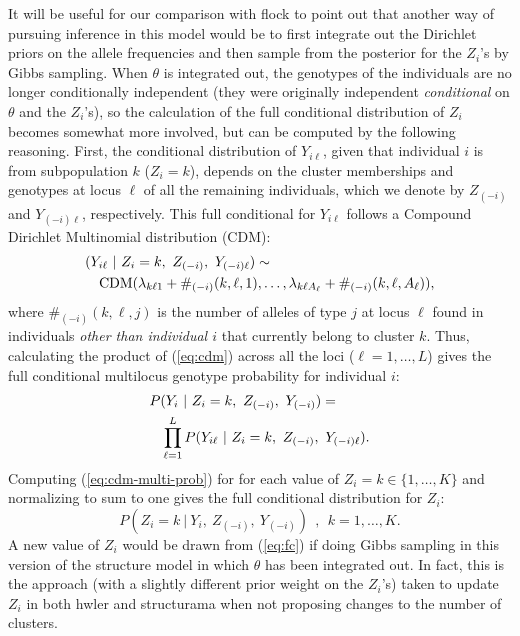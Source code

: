 It will be useful for our comparison with {\sc flock} to point out that another way 
of pursuing inference in this model would be to first integrate out the 
Dirichlet priors on the allele frequencies and then sample from the posterior
for the $Z_i$'s by Gibbs sampling.  When $\theta$ is integrated out, the genotypes 
of the individuals are no longer conditionally independent (they were originally
independent {\em conditional} on $\theta$ and the $Z_i$'s), so the calculation of 
the full conditional distribution of $Z_i$ becomes somewhat more involved,
but can be computed by the following reasoning. First, the 
conditional distribution of $Y_{i\ell}$, given that individual $i$ is from subpopulation $k$
(\ie $Z_i=k$), depends on the 
cluster memberships and genotypes at locus $\ell$ of all the remaining individuals,
which we denote by  $Z_{(-i)}$ and $Y_{(-i)\ell}$, respectively.
This full conditional for $Y_{i\ell}$ follows 
a Compound Dirichlet Multinomial distribution (CDM):
\begin{eqnarray}
\lefteqn{(Y_{i\ell}~|~Z_i=k,~Z_{(-i)},~Y_{(-i)\ell}) \sim} \label{eq:cdm}\\
& & \mathrm{CDM}(\lambda_{k\ell 1} + \#_{(-i)}(k,\ell,1), \ldots,
\lambda_{k\ell A_\ell} + \#_{(-i)}(k,\ell,A_\ell)), \nonumber
\end{eqnarray}
where $\#_{(-i)}(k,\ell,j)$ is the number of alleles of type $j$ at locus $\ell$
found in individuals {\em other than individual $i$} that currently
belong to cluster $k$. Thus, calculating the product of (\ref{eq:cdm}) across all the loci
($\ell = 1,\ldots,L$) gives the full conditional multilocus genotype probability 
for individual $i$:
\begin{eqnarray}
\lefteqn{P(Y_{i}~|~Z_i=k,~Z_{(-i)},~Y_{(-i)}) =}  \label{eq:cdm-multi-prob} \\
& &  \prod_{\ell=1}^L P(Y_{i\ell}~|~Z_i=k,~Z_{(-i)},~Y_{(-i)\ell}). \nonumber
\end{eqnarray}
Computing (\ref{eq:cdm-multi-prob}) for 
for each value of $Z_i=k \in 
\{1,\ldots,K\}$ 
and normalizing to sum to one gives the full conditional distribution for 
$Z_i$:
\begin{equation}
P(Z_i=k~|~Y_i, ~Z_{(-i)},~Y_{(-i)})~~,~~k=1,\ldots,K.
\label{eq:fc}
\end{equation}
A new value of $Z_i$ would be drawn from (\ref{eq:fc}) if doing Gibbs sampling in this
version of the {\sc structure} model in which $\theta$ has been integrated out.  In 
fact,
this is the approach (with a slightly different prior weight on the $Z_i$'s) taken to 
update 
$Z_i$ in both {\sc hwler} \citep{Pel&Mas2006} and {\sc structurama} \citep{Hue&And2007} 
when not
proposing changes to the number of clusters.



